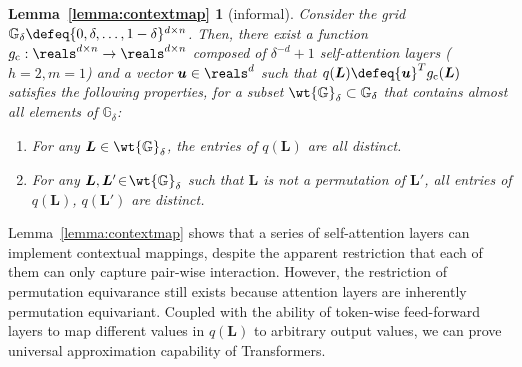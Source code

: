 \documentclass{article} %
\def\vu{{\bm{u}}}
\def\mL{{\bm{L}}}
\def\sG{{\mathbb{G}}}
\begin{document}
\newtheorem*{lem-contextmap-sketch}{Lemma~\ref{lemma:contextmap}}

\begin{lem-contextmap-sketch}[informal]
Consider the grid $\sG_{\delta} \defeq \{0, \delta, \dots, 1-\delta\}^{d \times n}$. Then, there exist a function $g_{\rm c}: \reals^{d \times n} \to \reals^{d \times n}$ composed of $\delta^{-d} + 1$ self-attention layers \textup{($h = 2, m = 1$)} and a vector $\vu \in \reals^d$ such that $q(\mL) \defeq \vu^T g_{\rm c}(\mL)$ satisfies the following properties, for a subset $\wt {\sG}_{\delta} \subset \sG_{\delta}$ that contains almost all elements of $\sG_{\delta}$:
\begin{enumerate}[\hspace{5pt}1.]
\setlength{\itemsep}{-3pt}
    \item For any $\mL \in \wt {\sG}_{\delta}$, the entries of $q(\mL)$ are all distinct.
    \item For any $\mL, \mL' \!\in\! \wt {\sG}_{\delta}$ such that $\mL$ is not a permutation of $\mL'$, all entries of $q(\mL)$, $q(\mL')$ are distinct.
\end{enumerate}
\end{lem-contextmap-sketch}

Lemma~\ref{lemma:contextmap} shows that a series of self-attention layers can implement contextual mappings, despite the apparent restriction that each of them can only capture pair-wise interaction. However, the restriction of permutation equivarance still exists because attention layers are inherently permutation equivariant. Coupled with the ability of token-wise feed-forward layers to map different values in $q(\mL)$ to arbitrary output values, we can prove universal approximation capability of Transformers.


\end{document}
